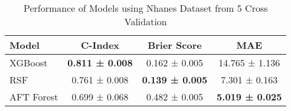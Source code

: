 \begin{table}[h!]
\centering
\caption{Performance of Models using Nhanes Dataset from 5 Cross Validation}
\label{tab:performance_nhanes}
\begin{tabular}{l|c|c|c}
\hline
\textbf{Model} & \textbf{C-Index} & \textbf{Brier Score} & \textbf{MAE} \\
\hline
XGBoost & \textbf{0.811 ± 0.008} & 0.162 ± 0.005 & 14.765 ± 1.136 \\
RSF & 0.761 ± 0.008 & \textbf{0.139 ± 0.005} & 7.301 ± 0.163 \\
AFT Forest & 0.699 ± 0.068 & 0.482 ± 0.005 & \textbf{5.019 ± 0.025} \\
\hline
\end{tabular}
\end{table}
